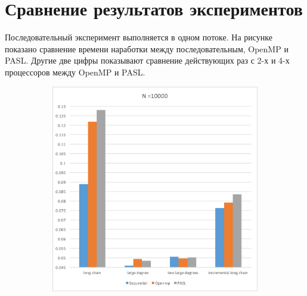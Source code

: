 \documentclass[specification,annotation]{itmo-student-thesis}
\newcommand{\revise}[1]{{\color{red!70!black} #1 }}
\begin{document}
\section{Сравнение результатов экспериментов}

\revise{
Последовательный эксперимент выполняется в одном потоке. На рисунке показано сравнение времени наработки между последовательным, OpenMP и PASL. Другие две цифры показывают сравнение действующих раз с 2-х 
и 4-х процессоров между OpenMP и PASL.
}

\begin{figure}[!ht]
\centering
\begin{subfigure}[b]{0.45\textwidth}
    \includegraphics[width=\textwidth]{pic/results-1-a.png}
\end{subfigure}~~\begin{subfigure}[b]{0.45\textwidth}

\end{subfigure}
\end{figure}
\end{document}
